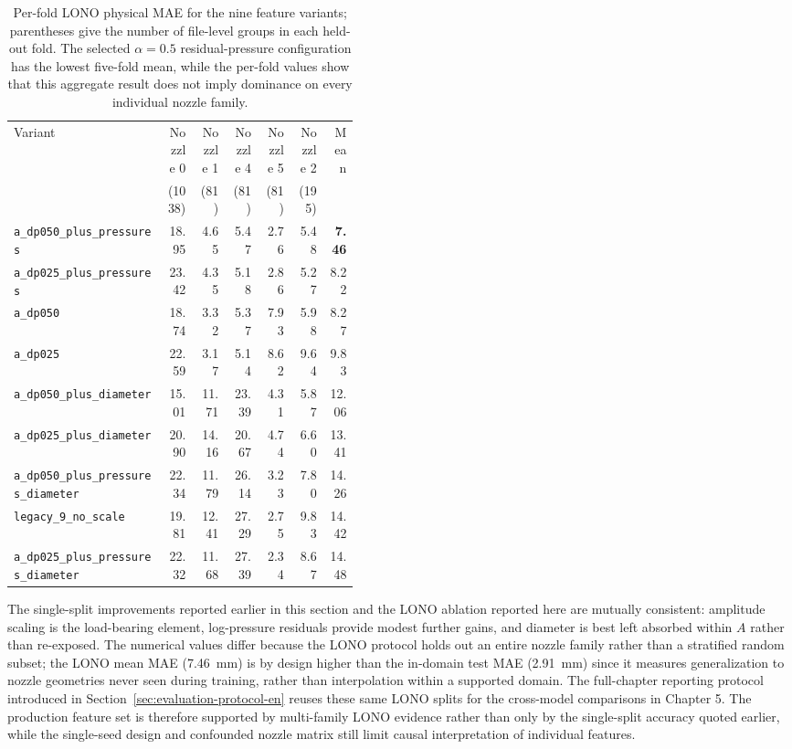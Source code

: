 \begin{table}[!ht]
\centering
\footnotesize
\setlength{\tabcolsep}{4pt}
\begin{tabular}{@{}L{0.44\linewidth}rrrrr|r@{}}
\toprule
Variant & Nozzle 0 & Nozzle 1 & Nozzle 4 & Nozzle 5 & Nozzle 2 & Mean \\
& \footnotesize(1038) & \footnotesize(81) & \footnotesize(81) & \footnotesize(81) & \footnotesize(195) & \\
\midrule
\texttt{a\_dp050\_plus\_pressures} & 18.95 & 4.65 & 5.47 & 2.76 & 5.48 & \textbf{7.46} \\
\texttt{a\_dp025\_plus\_pressures} & 23.42 & 4.35 & 5.18 & 2.86 & 5.27 & 8.22 \\
\texttt{a\_dp050} & 18.74 & 3.32 & 5.37 & 7.93 & 5.98 & 8.27 \\
\texttt{a\_dp025} & 22.59 & 3.17 & 5.14 & 8.62 & 9.64 & 9.83 \\
\midrule
\texttt{a\_dp050\_plus\_diameter} & 15.01 & 11.71 & 23.39 & 4.31 & 5.87 & 12.06 \\
\texttt{a\_dp025\_plus\_diameter} & 20.90 & 14.16 & 20.67 & 4.74 & 6.60 & 13.41 \\
\texttt{a\_dp050\_plus\_pressures\_diameter} & 22.34 & 11.79 & 26.14 & 3.23 & 7.80 & 14.26 \\
\texttt{legacy\_9\_no\_scale} & 19.81 & 12.41 & 27.29 & 2.75 & 9.83 & 14.42 \\
\texttt{a\_dp025\_plus\_pressures\_diameter} & 22.32 & 11.68 & 27.39 & 2.34 & 8.67 & 14.48 \\
\bottomrule
\end{tabular}
\caption{Per-fold LONO physical MAE for the nine feature variants; parentheses give the number of file-level groups in each held-out fold. The selected \(\alpha=0.5\) residual-pressure configuration has the lowest five-fold mean, while the per-fold values show that this aggregate result does not imply dominance on every individual nozzle family.}
\label{tab:stage1-lono-ablation-per-fold}
\end{table}
\FloatBarrier

The single-split improvements reported earlier in this section and the LONO ablation reported here are mutually consistent: amplitude scaling is the load-bearing element, log-pressure residuals provide modest further gains, and diameter is best left absorbed within \(A\) rather than re-exposed. The numerical values differ because the LONO protocol holds out an entire nozzle family rather than a stratified random subset; the LONO mean MAE (\SI{7.46}{mm}) is by design higher than the in-domain test MAE (\SI{2.91}{mm}) since it measures generalization to nozzle geometries never seen during training, rather than interpolation within a supported domain. The full-chapter reporting protocol introduced in Section~\ref{sec:evaluation-protocol-en} reuses these same LONO splits for the cross-model comparisons in Chapter 5. The production feature set is therefore supported by multi-family LONO evidence rather than only by the single-split accuracy quoted earlier, while the single-seed design and confounded nozzle matrix still limit causal interpretation of individual features.

